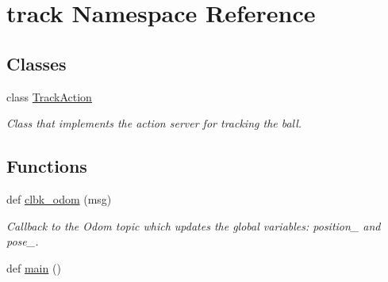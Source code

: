 \hypertarget{namespacetrack}{}\section{track Namespace Reference}
\label{namespacetrack}
\subsection*{Classes}
\begin{DoxyCompactItemize}
\item 
class \hyperlink{classtrack_1_1TrackAction}{Track\+Action}
\begin{DoxyCompactList}\small\item\em Class that implements the action server for tracking the ball. \end{DoxyCompactList}\end{DoxyCompactItemize}
\subsection*{Functions}
\begin{DoxyCompactItemize}
\item 
def \hyperlink{namespacetrack_ac547a00259cf9bddfb37b60063740e8d}{clbk\+\_\+odom} (msg)
\begin{DoxyCompactList}\small\item\em Callback to the Odom topic which updates the global variables\+: position\+\_\+ and pose\+\_\+. \end{DoxyCompactList}\item 
def \hyperlink{namespacetrack_a30188f067a9106a2f3e2ecedfd9cc52a}{main} ()
\end{DoxyCompactItemize}
